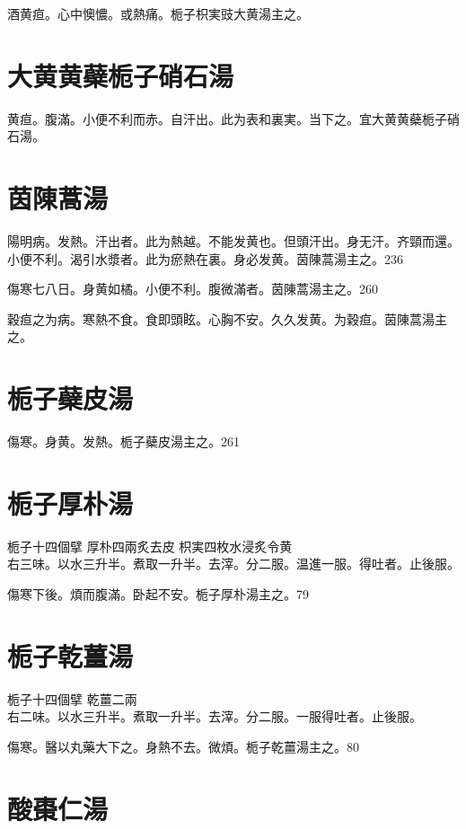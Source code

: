 酒黄疸。心中懊憹。或熱痛。栀子{\khaaitp 枳実豉}大黄湯主之。

\section{大黄黄蘗栀子硝石湯}

黄疸。腹滿。小便不利而赤。自汗出。此为表和裏実。当下之。宜大黄{\khaaitp 黄蘗栀子}硝石湯。

\section{茵陳蒿湯}

陽明病。发熱。汗出者。此为熱越。不能发黄也。但頭汗出。身无汗。齐頸而還。小便不利。渴引水漿者。此为瘀熱在裏。身必发黄。茵陳{\khaaitp 蒿}湯主之。236

傷寒七八日。身黄如橘。小便不利。腹微滿者。茵陳{\khaaitp 蒿}湯主之。260

穀疸之为病。寒熱不食。食即頭眩。心胸不安。久久发黄。为穀疸。茵陳蒿湯主之。

\section{栀子蘗皮湯}

傷寒。身黄。发熱。栀子蘗皮湯主之。261

\section{栀子厚朴湯}

栀子{\scriptsize 十四個擘} 厚朴{\scriptsize 四兩炙去皮} 枳実{\scriptsize 四枚水浸炙令黄}\\
右三味。以水三升半。煮取一升半。去滓。分二服。温進一服。得吐者。止後服。

傷寒下後。煩而腹滿。卧起不安。栀子厚朴湯主之。79

\section{栀子乾薑湯}

栀子{\scriptsize 十四個擘} 乾薑{\scriptsize 二兩}\\
右二味。以水三升半。煮取一升半。去滓。分二服。一服得吐者。止後服。

傷寒。醫以丸藥大下之。身熱不去。微煩。栀子乾薑湯主之。80

\section{酸棗{\khaaitp 仁}湯}


